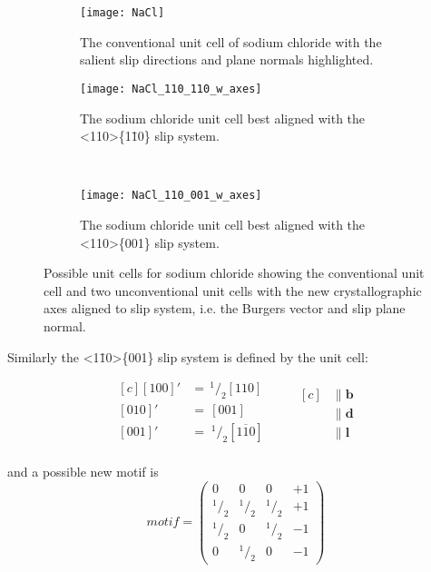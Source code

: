 \begin{figure}
\centering


    \begin{subfigure}{0.55\textwidth}
    \centering
    \texttt{[image: NaCl]}
    \caption{The conventional unit cell of sodium chloride with the salient slip directions and plane normals highlighted. \label{fig:NaCl_conventional_cell_slip_system_marked}}
    \end{subfigure}

    \begin{subfigure}{0.4\textwidth}
    \centering
    \texttt{[image: NaCl\_110\_110\_w\_axes]}
    \caption{The sodium chloride unit cell best aligned with the <110>\{1\={1}0\} slip system. \label{fig:NaCl_110_110_unit_cell}}
    \end{subfigure}
    ~
    \begin{subfigure}{0.4\textwidth}
    \centering
    \texttt{[image: NaCl\_110\_001\_w\_axes]}
    \caption{The sodium chloride unit cell best aligned with the <110>\{001\} slip system. \label{fig:NaCl_110_001_unit_cell}}
    \end{subfigure}

\caption{Possible unit cells for sodium chloride showing the conventional unit cell and two unconventional unit cells with the new crystallographic axes aligned to slip system, i.e. the Burgers vector and slip plane normal.\label{fig:unconventional_NaCl_unit_cells}}
\end{figure}






Similarly the  <1\={1}0>\{001\} slip system is defined by the unit cell:

\begin{equation*}
\begin{aligned}[c]
 {[100]}' &=\, ^{1}\!/_{2} [110] \\
 {[010]}' &=\,  [001] \\
 {[001]}' &=\; ^{1}\!/_{2} [1\overline{1}0] \\
\end{aligned}
\qquad
\begin{aligned}[c]
&\parallel \mathbf{b} \\
&\parallel \mathbf{d} \\
&\parallel \mathbf{l}
\end{aligned}
\end{equation*}


and a possible new motif is 
$$
motif = \begin{pmatrix}
0 & 0 & 0 & +1 \\
^{1}\!/_{2} & ^{1}\!/_{2} & ^{1}\!/_{2} & +1 \\
^{1}\!/_{2} & 0 & ^{1}\!/_{2} & -1 \\
0 & ^{1}\!/_{2} & 0 & -1
\end{pmatrix}
$$


